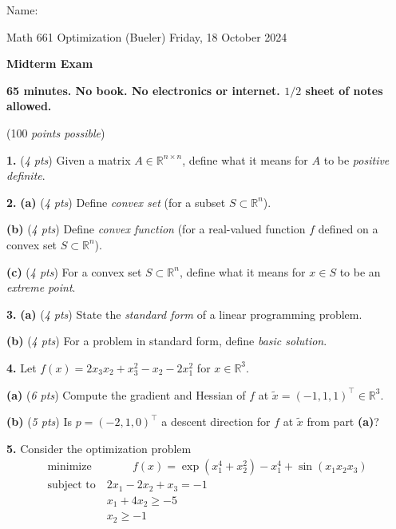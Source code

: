 \documentclass[11pt]{amsart}
\newcommand{\RR}{{\mathbb{R}}}
\newcommand{\prob}[1]{\bigskip\noindent\textbf{#1.} }
\newcommand{\pts}[1]{(\emph{#1 pts})}
\newcommand{\probpts}[2]{\prob{#1} \pts{#2}}
\newcommand{\ppartpts}[2]{\textbf{(#1)} \pts{#2}}
\newcommand{\epartpts}[2]{\medskip\noindent \textbf{(#1)} \pts{#2}}
\begin{document}
\hfill \Large Name:\underline{\phantom{Ed Bueler really really long long long name}}
\medskip

\scriptsize \noindent Math 661 Optimization (Bueler) \hfill Friday, 18 October 2024
\medskip

\Large\centerline{\textbf{Midterm Exam}}

\smallskip
\large
\begin{center}
\textbf{65 minutes.  No book.  No electronics or internet.  $1/2$ sheet of notes allowed.}

(100 \emph{points possible})
\end{center}

\medskip
\thispagestyle{empty}

\probpts{1}{4}  Given a matrix $A\in \RR^{n\times n}$, define what it means for $A$ to be \emph{positive definite}.
\vfill

\prob{2} \ppartpts{a}{4} Define \emph{convex set} (for a subset $S \subset \RR^n$).
\vfill

\epartpts{b}{4} Define \emph{convex function} (for a real-valued function $f$ defined on a convex set $S\subset \RR^n$).
\vfill

\epartpts{c}{4} For a convex set $S\subset \RR^n$, define what it means for $x\in S$ to be an \emph{extreme point}.
\vfill


\clearpage\newpage
\prob{3} \ppartpts{a}{4}  State the \emph{standard form} of a linear programming problem.
\vfill

\epartpts{b}{4}  For a problem in standard form, define \emph{basic solution}.
\vfill


\prob{4}  Let $f(x) = 2 x_3 x_2 + x_3^2 - x_2 - 2 x_1^2$ for $x\in \RR^3$.

\epartpts{a}{6}   Compute the gradient and Hessian of $f$ at $\tilde x = (-1,1,1)^\top \in \RR^3$.
\vspace{3.0in}

\epartpts{b}{5}   Is $p = (-2,1,0)^\top$ a descent direction for $f$ at $\tilde x$ from part \textbf{(a)}?
\vspace{1.5in}


\clearpage\newpage
\prob{5}  Consider the optimization problem
    $$\begin{matrix}
    \text{minimize}\phantom{x} & \phantom{xxxx}f(x) = \exp(x_1^4 + x_2^2) - x_1^4 + \sin(x_1 x_2 x_3)\\
    \text{subject to} & 2 x_1 - 2 x_2 + x_3 = -1 \\
                      & x_1 + 4 x_2 \ge -5 \\
                      & x_2 \ge -1
    \end{matrix}$$
\end{document}
